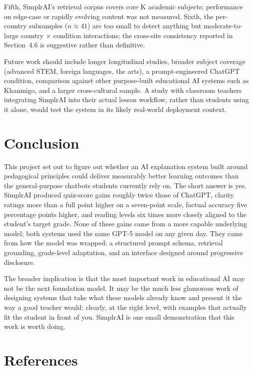\documentclass[11pt,letterpaper]{article}
\renewcommand{\baselinestretch}{1.12}  %
\begin{document}
Fifth, SimplrAI's retrieval corpus covers core K academic
subjects; performance on edge-case or rapidly evolving content was not measured.
Sixth, the per-country subsamples ($n \approx 41$) are too small
to detect anything but moderate-to-large country $\times$ condition interactions;
the cross-site consistency reported in Section~4.6 is suggestive rather than
definitive.

Future work should include longer longitudinal studies, broader subject coverage
(advanced STEM, foreign languages, the arts), a prompt-engineered ChatGPT
condition, comparison against other purpose-built educational AI systems such
as Khanmigo, and a larger cross-cultural sample. A study with classroom teachers
integrating SimplrAI into their actual lesson workflow, rather than students
using it alone, would test the system in its likely real-world deployment
context.

\section{Conclusion}

This project set out to figure out whether an AI explanation system built
around pedagogical principles could deliver measurably better learning outcomes
than the general-purpose chatbots students currently rely on. The short answer
is yes. SimplrAI produced quiz-score gains roughly twice those of
ChatGPT, clarity ratings more than a full point higher on a seven-point scale,
factual accuracy five percentage points higher, and reading levels six times
more closely aligned to the student's target grade. None of these gains came
from a more capable underlying model; both systems used the same GPT-5 model
on any given day. They came from how the model was wrapped: a structured prompt
schema, retrieval grounding, grade-level adaptation, and an interface designed
around progressive disclosure.

The broader implication is that the most important work in educational AI may
not be the next foundation model. It may be the much less glamorous work of
designing systems that take what these models already know and present it the
way a good teacher would: clearly, at the right level, with examples that
actually fit the student in front of you. SimplrAI is one small demonstration
that this work is worth doing.


\section*{References}
\renewcommand{\baselinestretch}{1.05}\small
\end{document}
